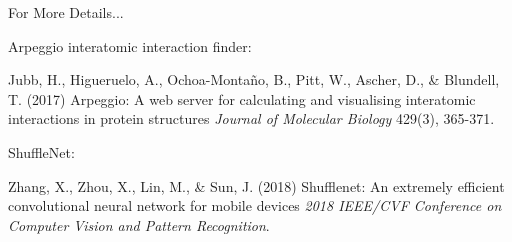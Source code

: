 \documentclass[aspectratio=169,xcolor=dvipsnames]{beamer}
\begin{document}
\begin{frame}{For More Details...}
    \footnotesize{
    Arpeggio interatomic interaction finder:
    \begin{thebibliography}{99}
         Jubb, H., Higueruelo, A., Ochoa-Montaño, B., Pitt, W., Ascher, D., \& Blundell, T. (2017)
        \newblock Arpeggio: A web server for calculating and visualising interatomic interactions in protein structures
        \newblock \emph{Journal of Molecular Biology} 429(3), 365-371.
    \end{thebibliography}
    \vspace{3mm}
    ShuffleNet:
    \begin{thebibliography}{99}
         Zhang, X., Zhou, X., Lin, M., \& Sun, J. (2018)
        \newblock Shufflenet: An extremely efficient convolutional neural network for mobile devices
        \newblock \emph{2018 IEEE/CVF Conference on Computer Vision and Pattern Recognition}.
    \end{thebibliography}
    }
\end{frame}
\end{document}
